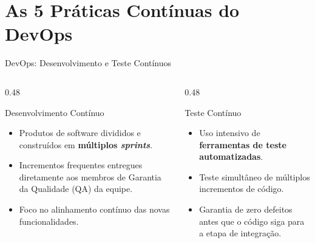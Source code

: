 \documentclass[aspectratio=169, 9pt]{beamer}
\begin{document}
\section{As 5 Práticas Contínuas do DevOps}

\begin{frame}{DevOps: Desenvolvimento e Teste Contínuos}
  \begin{columns}[T]
    \begin{column}{0.48\textwidth}
      \begin{block}{Desenvolvimento Contínuo}
        \begin{itemize}
          \item Produtos de software divididos e construídos em \textbf{múltiplos \textit{sprints}}.
          \item Incrementos frequentes entregues diretamente aos membros de Garantia da Qualidade (QA) da equipe.
          \item Foco no alinhamento contínuo das novas funcionalidades.
        \end{itemize}
      \end{block}
    \end{column}

    \begin{column}{0.48\textwidth}
      \begin{exampleblock}{Teste Contínuo}
        \begin{itemize}
          \item Uso intensivo de \textbf{ferramentas de teste automatizadas}.
          \item Teste simultâneo de múltiplos incrementos de código.
          \item Garantia de zero defeitos antes que o código siga para a etapa de integração.
        \end{itemize}
      \end{exampleblock}
    \end{column}
  \end{columns}
\end{frame}
\end{document}
